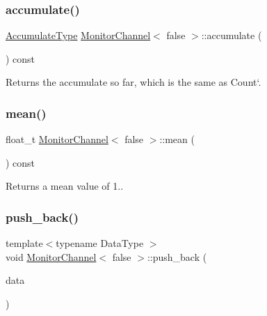 \subsubsection{\texorpdfstring{accumulate()}{accumulate()}}
{\footnotesize\ttfamily \hyperlink{classMonitorChannel_3_01false_01_4_ac36f4071aff4c11fda63ff839d13345c}{Accumulate\+Type} \hyperlink{classMonitorChannel}{Monitor\+Channel}$<$ false $>$\+::accumulate (\begin{DoxyParamCaption}{ }\end{DoxyParamCaption}) const\hspace{0.3cm}{\ttfamily [inline]}}



Returns the accumulate so far, which is the same as \textquotesingle{}Count`. 

\mbox{\label{classMonitorChannel_3_01false_01_4_aff1c900b36c53bd674b53f94c3c2770b}} 
\subsubsection{\texorpdfstring{mean()}{mean()}}
{\footnotesize\ttfamily float\+\_\+t \hyperlink{classMonitorChannel}{Monitor\+Channel}$<$ false $>$\+::mean (\begin{DoxyParamCaption}{ }\end{DoxyParamCaption}) const\hspace{0.3cm}{\ttfamily [inline]}}

Returns a mean value of 1.. \mbox{\label{classMonitorChannel_3_01false_01_4_ac074706af7eebfb6478ffeedb87537ba}} 
\subsubsection{\texorpdfstring{push\+\_\+back()}{push\_back()}}
{\footnotesize\ttfamily template$<$typename Data\+Type $>$ \\
void \hyperlink{classMonitorChannel}{Monitor\+Channel}$<$ false $>$\+::push\+\_\+back (\begin{DoxyParamCaption}\item[{Data\+Type}]{data }\end{DoxyParamCaption})\hspace{0.3cm}{\ttfamily [inline]}}

